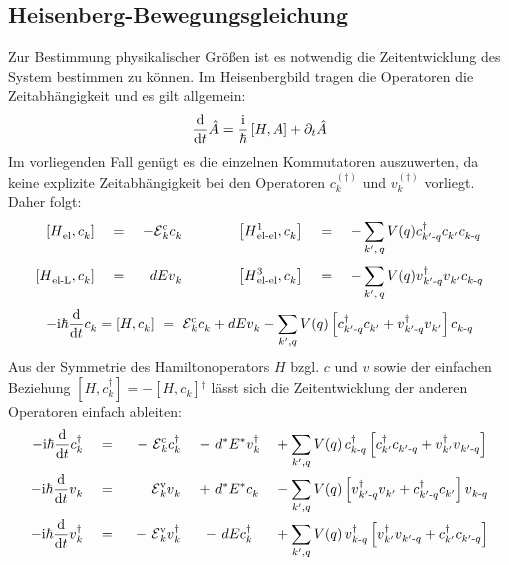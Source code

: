 \documentclass[a4paper,11pt]{article}
\newcommand{\ind}[2]{{_{#1}^{#2}}}
\newcommand{\+}{\dagger}
\newcommand{\E}{\mathcal{E}}
\newcommand{\dt}[1]{\frac{\tt d #1}{\tt d t}}
\renewcommand{\^}{\hat}
\renewcommand{\tt}{\text}
\renewcommand{\~}{\widetilde}
\begin{document}
\subsection{Heisenberg-Bewegungsgleichung}
Zur Bestimmung physikalischer Größen ist es notwendig die Zeitentwicklung des System bestimmen zu können. Im Heisenbergbild tragen die Operatoren die Zeitabhängigkeit und es gilt allgemein: 
\begin{align*}
\dt{} \^A  = \frac{\tt i}{\hbar}\left [H,A\right ] + \partial_t \^{A}
\end{align*}
Im vorliegenden Fall genügt es die einzelnen Kommutatoren auszuwerten, da keine explizite Zeitabhängigkeit bei den Operatoren $c\ind{k}{(\+)}$ und  $v\ind{k}{(\+)}$ vorliegt. Daher folgt:
\begin{alignat*}{7}
\left [H\ind{\tt{el}}{},c\ind{k}{}\right ]   && \ = \ &&-\E \ind{k}{\tt c} c\ind{k}{} && \qquad &&
 \left [H\ind{\tt{el-el}}{1},c\ind{k}{}\right ]  &&\ =\ && -\sum_{k',\,q} \,&V(q)c\ind{k'\tt -q}{\+}c\ind{k'}{}c\ind{k\tt -q}{} \\
\left [H\ind{\tt{el-L}}{},c\ind{k}{}\right ]  &&\ =\ && dE v\ind{k}{} && \qquad &&
\left [H\ind{\tt{el-el}}{3},c\ind{k}{}\right ]  &&\ =\ && -\sum_{k',\,q}^{}\, &V(q)v\ind{k'\tt-q}{\+}v\ind{k'}{}c\ind{k\tt -q}{}
\end{alignat*} 
\[ 	-\tt i\hbar\dt{} c\ind{k}{}  =  \left [H,c\ind{k}{}\right ] \ = \  \E \ind{k}{\tt c}c\ind{k}{}+dEv\ind{k}{} - \sum_{k',q}^{} V(q)\left [c\ind{k'\tt -q}{\+}c\ind{k'}{}+v\ind{k'\tt-q}{\+}v\ind{k'}{}\right ]c\ind{k\tt -q}{} 		\]
Aus der Symmetrie des Hamiltonoperators $H$ bzgl. $c$ und $v$ sowie der einfachen Beziehung $[H,c\ind{k}{\+}]=-[H,c\ind{k}{}]\ind{}{\+}$ lässt sich die Zeitentwicklung der anderen Operatoren einfach ableiten: 
\begin{alignat*}{5}
-\tt i\hbar\dt{} c\ind{k}{\+}   &&\ =\ && \ - \ \E \ind{k}{\tt c}c\ind{k}{\+} && \ -\  d^*&E^*v\ind{k}{\+} &&+ \sum_{k',q}^{} V(q)\, c\ind{k\tt -q}{\+}\left [c\ind{k'}{\+}c\ind{k'\tt -q}{}+v\ind{k'}{\+}v\ind{k'\tt-q}{}\right ] \\
-\tt i\hbar\dt{} v\ind{k}{}  && \ = \  &&  \E \ind{k}{\tt v}v\ind{k}{}    &&\ +\  d^*&E^* c\ind{k}{}  &&- \sum_{k',q}^{} V(q)\left [v\ind{k'\tt -q}{\+}v\ind{k'}{}+c\ind{k'\tt-q}{\+}c\ind{k'}{}\right ]v\ind{k\tt -q}{} \\ 
-\tt i\hbar\dt{} v\ind{k}{\+}   &&\ =\ && \ -\ \E \ind{k}{\tt v}v\ind{k}{\+} && \ -\ d&Ec\ind{k}{\+} &&+ \sum_{k',q}^{} V(q)\, v\ind{k\tt -q}{\+}\left [v\ind{k'}{\+}v\ind{k'\tt -q}{}+c\ind{k'}{\+}c\ind{k'\tt-q}{}\right ]
\end{alignat*}
\end{document}
